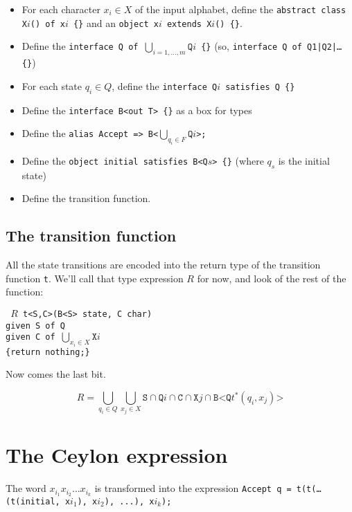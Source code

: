 \documentclass[a4paper, 11pt]{article}
\newcommand{\code}[1]{\texttt{#1}}
\begin{document}
\begin{itemize}
\item For each character $x_i\in X$ of the input alphabet, define the \code{abstract class X$i$() of x$i$ \{\}} and an \code{object x$i$ extends X$i$() \{\}}.
\item Define the \code{interface Q of $\bigcup\limits_{i=1,\ldots,m}{\code{Q}i}$ \{\}} (so, \code{interface Q of Q1|Q2|\ldots \{\}})
\item For each state $q_i\in Q$, define the \code{interface Q$i$ satisfies Q \{\}}
\item Define the \code{interface B<out T> \{\}} as a box for types
\item Define the \code{alias Accept => B<$\bigcup\limits_{q_i\in F}\code{Q}i$>;}
\item Define the \code{object initial satisfies B<Q$s$> \{\}} (where $q_s$ is the initial state)
\item Define the transition function.
\end{itemize}

\subsection{The transition function}

All the state transitions are encoded into the return type of the transition function \code{t}.
We’ll call that type expression $R$ for now, and look of the rest of the function:

\code{
$R$ t<S,C>(B<S> state, C char)\\
given S of Q\\
given C of $\bigcup\limits_{x_i\in X}\code{X}i$\\
\{return nothing;\}
}

Now comes the last bit.

\[
R = \bigcup\limits_{q_i\in Q}\bigcup\limits_{x_j\in X} \code{S}\cap\code{Q}i \cap \code{C}\cap\code{X}j \cap \code{B<Q}t^\ast(q_i, x_j)\code{>}
\]

\section{The Ceylon expression}

The word $x_{i_1}x_{i_2}\ldots x_{i_k}$ is transformed into the expression
\code{Accept q = t(t(\ldots (t(initial, x$i_1$), x$i_2$), ...), x$i_k$);}
\end{document}
